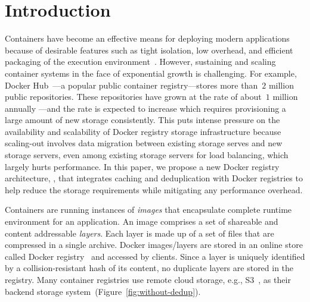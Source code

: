\section{Introduction}
 \label{sec:intro}

\vspace{-2pt}
 
 Containers 
 have become an effective means for deploying modern applications because 
 of desirable features such as tight isolation, low overhead, and efficient packaging of the execution environment~\cite{docker}. 
 However,
 sustaining and scaling container systems in the face of exponential growth is challenging. 
 For example, Docker Hub~\cite{docker-hub}---a popular public container registry---stores more than~$2$ million public repositories. 
 These repositories have grown at the rate of about~$1$ million annually ---and the rate is expected to increase which
 requires provisioning a large amount of new storage consistently.
 This puts intense pressure on the availability and scalability of Docker registry storage infrastructure 
 because scaling-out involves data migration between existing storage serves and new storage servers, even among existing storage servers for load balancing,
 which largely hurts performance.
 In this paper, we propose a new Docker registry architecture, \sysname,
 that integrates caching and deduplication with Docker registries to help reduce the storage requirements while mitigating any performance overhead.
 
Containers are running instances of \emph{images} that encapsulate complete runtime environment for an application.
An image comprises a set of shareable and content addressable \emph{layers}.
Each layer is made up of a set of files that are compressed in a single archive. 
Docker images/layers are stored in an online store called Docker registry~\cite{docker-hub} and accessed by clients. %
Since a layer is uniquely identified by a collision-resistant hash of its content, 
no duplicate layers are stored in the registry.
Many container registries use remote cloud storage, e.g., S3~\cite{s3}, 
as their backend storage system~(Figure~\ref{fig:without-dedup}).


